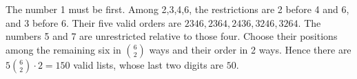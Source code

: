 The number 1 must be first. Among 2,3,4,6, the restrictions are 2 before 4 and 6, and 3 before 6. Their five valid orders are $2346,2364,2436,3246,3264$. The numbers 5 and 7 are unrestricted relative to those four. Choose their positions among the remaining six in $\binom62$ ways and their order in 2 ways. Hence there are $5\binom62\cdot2=150$ valid lists, whose last two digits are $\boxed{50}$.
